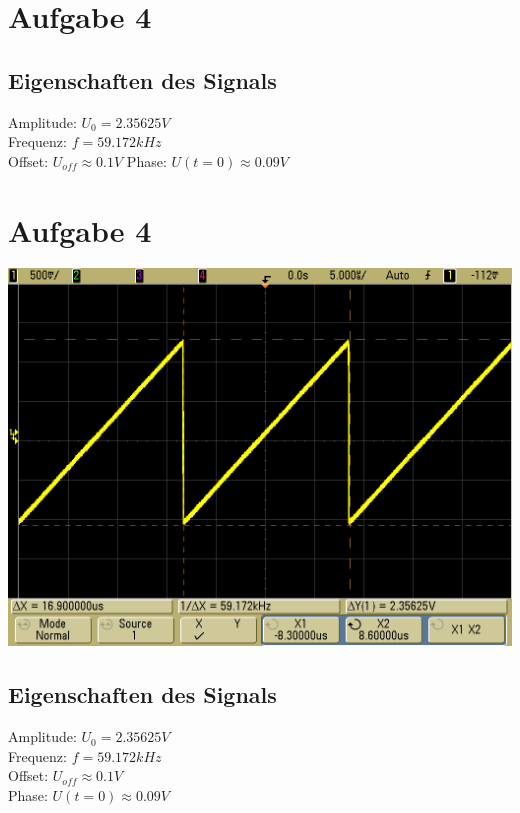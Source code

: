 \documentclass[compress,11pt]{beamer}
\begin{document}
\section{Aufgabe 4}
\begin{frame}
\subsection{Eigenschaften des Signals}
Amplitude: $U_0 = 2.35625 V$ \\
Frequenz: $f = 59.172 kHz$ \\
Offset: $U_{off} \approx 0.1 V$
Phase: $U(t=0) \approx 0.09 V$\
\end{frame}

\section{Aufgabe 4}
\begin{frame}
\includegraphics[width=\textwidth]{images/scope_13}
\end{frame}
\begin{frame}
\subsection{Eigenschaften des Signals}
Amplitude: $U_0 = 2.35625 V$ \\
Frequenz: $f = 59.172 kHz$ \\
Offset: $U_{off} \approx 0.1 V$ \\
Phase: $U(t=0) \approx 0.09 V$\
\end{frame}
\end{document}
